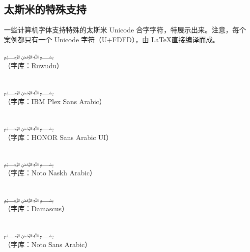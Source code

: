 \begin{note}
    \subsection*{太斯米的特殊支持}
    
    一些计算机字体支持特殊的太斯米 Unicode 合字字符，特展示出来。注意，每个案例都只有一个 Unicode 字符（U+FDFD），由 \LaTeX 直接编译而成。

    \begin{center}

        {\rm \LARGE {} ﷽}\nopagebreak\\
        （字库：Ruwudu）

        ~\\
        {\rm \Large {} ﷽}\nopagebreak\\
        （字库：IBM Plex Sans Arabic）


        ~\\
        {\rm \Large {} ﷽}\nopagebreak\\
        （字库：HONOR Sans Arabic UI）

        ~\\
        {\rm \Huge {} ﷽}\nopagebreak\\
        （字库：Noto Naskh Arabic）

        ~\\
        {\rm \Huge {} ﷽}\nopagebreak\\
        （字库：Damascus）

        ~\\
        {\rm \Huge {} ﷽}\nopagebreak\\
        （字库：Noto Sans Arabic）


\end{center}
\end{note}
